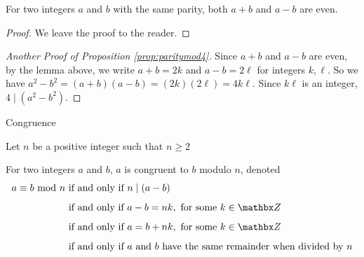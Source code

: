 \vspace*{1em}

\begin{lemma}
For two integers $a$ and $b$ with the same parity, both $a+b$ and $a-b$ are even.
\end{lemma}
\begin{proof}
We leave the proof to the reader.
\end{proof}

\vspace*{1em}

\begin{proof}[Another Proof of Proposition \ref{prop:paritymod4}]
Since $a+b$ and $a - b$ are even, by the lemma above, we write $a+b = 2k$ and $a - b = 2\ell$ for integers $k,\ell$. So we have $a^2 - b^2 = (a +b)(a - b) = (2k)(2\ell) = 4k\ell$. Since $k\ell$ is an integer, $4\mid(a^2 - b^2)$.
\end{proof}

\vspace*{2em}

\begin{mdframed}
\begin{center}
{\Large Congruence}
\end{center}
\end{mdframed}
Let $n$ be a positive integer such that $n \geq 2$

\begin{definition}
For two integers $a$ and $b$, $a$ is congruent to $b$ modulo $n$, denoted
\begin{align*}
a \equiv b \modar{n} & \text{ if and only if } n \mid (a - b)\\[0.5em]
 & \text{ if and only if } a - b = nk, \text{ for some } k \in \zz\\[0.5em]
 & \text{ if and only if } a = b + nk, \text{ for some } k \in \zz\\[0.5em]
 & \text{ if and only if $a$ and $b$ have the same remainder when divided by $n$}
\end{align*}
\end{definition}

\vspace*{1em}

